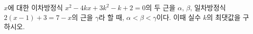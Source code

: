 $x$에 대한 이차방정식 $x^2-4kx+3k^2-k+2=0$의 두 근을 $\alpha$, $\beta$, 일차방정식 $2(x-1)+3=7-x$의 근을 $\gamma$라 할 때, $\alpha<\beta<\gamma$이다. 이때 실수 $k$의 최댓값을 구하시오.
